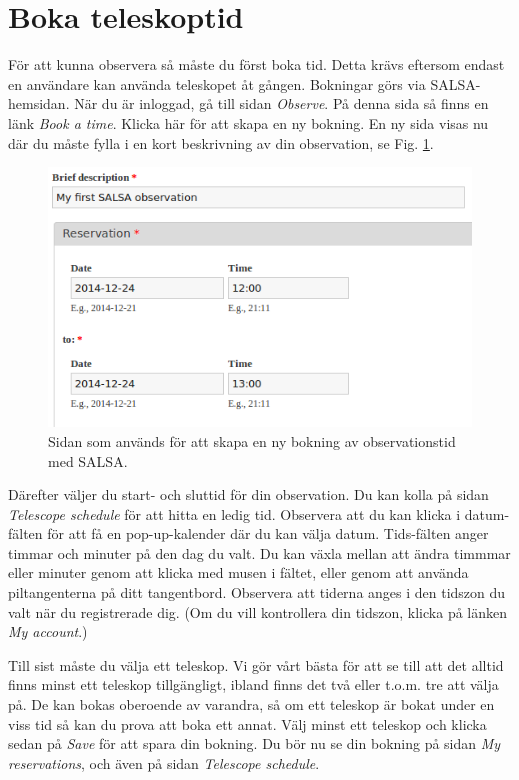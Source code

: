 \section{Boka teleskoptid}
För att kunna observera så måste du först boka tid. Detta krävs eftersom
endast en användare kan använda teleskopet åt gången. Bokningar görs via 
SALSA-hemsidan. När du är inloggad, gå till sidan \emph{Observe}. På denna sida
så finns en länk \emph{Book a time}. Klicka här för att skapa en ny bokning. 
En ny sida visas nu där du måste fylla i en kort beskrivning av din observation,
se Fig. \ref{fig:book}.
\begin{figure}[h]
\centering
\includegraphics[width=\textwidth]{../figures/SALSA_book.png}
\caption{\label{fig:book} Sidan som används för att skapa en ny bokning av 
	observationstid med SALSA.}
\end{figure}

Därefter väljer du start- och sluttid för din observation. Du kan kolla på sidan
\emph{Telescope schedule} för att hitta en ledig tid. Observera att du kan klicka
i datum-fälten för att få en pop-up-kalender där du kan välja datum. 
Tids-fälten anger timmar och minuter på den dag du valt. Du kan växla mellan att 
ändra timmmar eller minuter genom att klicka med musen i fältet, eller genom
att använda piltangenterna på ditt tangentbord. Observera att tiderna anges
i den tidszon du valt när du registrerade dig. (Om du vill kontrollera
din tidszon, klicka på länken \emph{My account}.)

Till sist måste du välja ett teleskop. Vi gör vårt bästa för att se till att 
det alltid finns minst ett teleskop tillgängligt, ibland finns det två eller t.o.m.
tre att välja på. De kan bokas oberoende av varandra, så om ett teleskop är bokat
under en viss tid så kan du prova att boka ett annat. Välj minst ett teleskop
och klicka sedan på \emph{Save} för att spara din bokning. Du bör nu se din bokning
på sidan \emph{My reservations}, och även på sidan \emph{Telescope
schedule}. 

